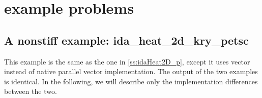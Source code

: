 \section{{\petsc} example problems}\label{s:ex_petsc}

\subsection{A nonstiff example: ida\_heat\_2d\_kry\_petsc}\label{ss:ida_heat_2d_kry_petsc}

This example is the same as the one in \ref{ss:idaHeat2D_p}, except 
it uses {\petsc} vector instead of {\sundials} native parallel vector 
implementation. The output of the two examples is identical. In the following, 
we will describe only the implementation differences between the two. 

